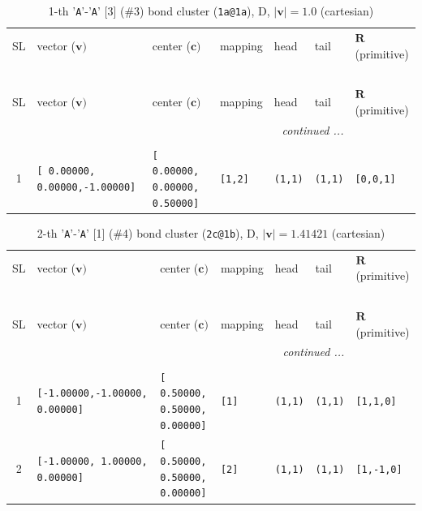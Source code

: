 \documentclass[fleqn,10pt,landscape]{jsarticle}
\begin{document}
\renewcommand{\arraystretch}{1.6}
\begin{longtable}[l]{cllllll}
\captionsetup{justification=raggedright, singlelinecheck=off}
\caption{1-th '\texttt{A}'-'\texttt{A}' [3] (\#3) bond cluster (\texttt{1a@1a}), D, $|\bm{v}|=1.0$ (cartesian)}
 \\
 \hline \hline
SL & vector ($\bm{v})$ & center ($\bm{c})$ & mapping & head & tail & $\bm{R}$ (primitive) \\ \hline \endfirsthead

\multicolumn{6}{l}{\tablename\ \thetable{}} \\
 \hline \hline
SL & vector ($\bm{v})$ & center ($\bm{c})$ & mapping & head & tail & $\bm{R}$ (primitive) \\ \hline \endhead

 \hline \hline
\multicolumn{6}{r}{\footnotesize\it continued ...} \\ \endfoot

 \hline \hline
\multicolumn{6}{r}{} \\ \endlastfoot

1 & \texttt{[ 0.00000, 0.00000,-1.00000]} & \texttt{[ 0.00000, 0.00000, 0.50000]} & \texttt{[1,2]} & \texttt{(1,1)} & \texttt{(1,1)} & \texttt{[0,0,1]} \\
\end{longtable}
\renewcommand{\arraystretch}{1.6}
\begin{longtable}[l]{cllllll}
\captionsetup{justification=raggedright, singlelinecheck=off}
\caption{2-th '\texttt{A}'-'\texttt{A}' [1] (\#4) bond cluster (\texttt{2c@1b}), D, $|\bm{v}|=1.41421$ (cartesian)}
 \\
 \hline \hline
SL & vector ($\bm{v})$ & center ($\bm{c})$ & mapping & head & tail & $\bm{R}$ (primitive) \\ \hline \endfirsthead

\multicolumn{6}{l}{\tablename\ \thetable{}} \\
 \hline \hline
SL & vector ($\bm{v})$ & center ($\bm{c})$ & mapping & head & tail & $\bm{R}$ (primitive) \\ \hline \endhead

 \hline \hline
\multicolumn{6}{r}{\footnotesize\it continued ...} \\ \endfoot

 \hline \hline
\multicolumn{6}{r}{} \\ \endlastfoot

1 & \texttt{[-1.00000,-1.00000, 0.00000]} & \texttt{[ 0.50000, 0.50000, 0.00000]} & \texttt{[1]} & \texttt{(1,1)} & \texttt{(1,1)} & \texttt{[1,1,0]} \\ \hline
2 & \texttt{[-1.00000, 1.00000, 0.00000]} & \texttt{[ 0.50000, 0.50000, 0.00000]} & \texttt{[2]} & \texttt{(1,1)} & \texttt{(1,1)} & \texttt{[1,-1,0]} \\
\end{longtable}
\end{document}
